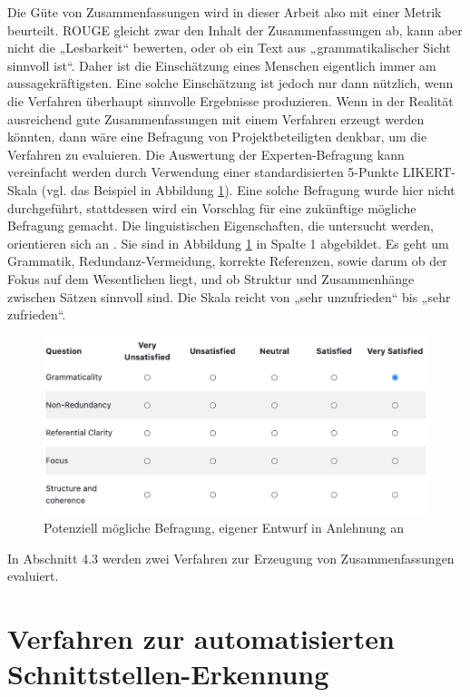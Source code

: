 Die Güte von Zusammenfassungen wird in dieser Arbeit also mit einer Metrik beurteilt. ROUGE gleicht zwar den Inhalt der Zusammenfassungen ab, kann aber nicht die „Lesbarkeit“ bewerten, oder ob ein Text aus „grammatikalischer Sicht sinnvoll ist“. Daher ist die Einschätzung eines Menschen eigentlich immer am aussagekräftigsten. Eine solche Einschätzung ist jedoch nur dann nützlich, wenn die Verfahren überhaupt sinnvolle Ergebnisse produzieren. Wenn in der Realität ausreichend gute Zusammenfassungen mit einem Verfahren erzeugt werden könnten, dann wäre eine Befragung von Projektbeteiligten denkbar, um die Verfahren zu evaluieren. Die Auswertung der Experten-Befragung kann vereinfacht werden durch Verwendung einer standardisierten 5-Punkte LIKERT-Skala (vgl. das Beispiel in Abbildung \ref{Abbildung:Dang}). Eine solche Befragung wurde hier nicht durchgeführt, stattdessen wird ein Vorschlag für eine zukünftige mögliche Befragung gemacht. Die linguistischen Eigenschaften, die untersucht werden, orientieren sich an \cite{Dang}. Sie sind in Abbildung \ref{Abbildung:Dang} in Spalte 1 abgebildet. Es geht um Grammatik, Redundanz-Vermeidung, korrekte Referenzen, sowie darum ob der Fokus auf dem Wesentlichen liegt, und ob Struktur und Zusammenhänge zwischen Sätzen sinnvoll sind. Die Skala reicht von „sehr unzufrieden“ bis „sehr zufrieden“. 
 
\begin{figure}[h]
\centering
\includegraphics[scale=0.9]{content/pics/Picture_9.png}
\caption{ Potenziell mögliche Befragung, eigener Entwurf in Anlehnung an \cite{Dang}}
\label{Abbildung:Dang}
\end{figure}

In Abschnitt 4.3 werden zwei Verfahren zur Erzeugung von Zusammenfassungen evaluiert.


\section{Verfahren zur automatisierten Schnittstellen-Erkennung}

